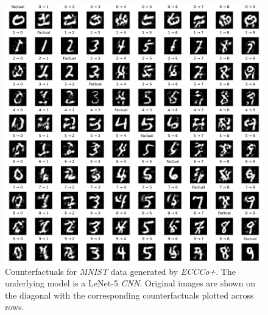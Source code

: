 \begin{figure}
  \centering
  \includegraphics[width=1.0\linewidth]{../www/mnist_all_lenet_eccco.png}
  \caption{Counterfactuals for \textit{MNIST} data generated by \textit{ECCCo+}. The underlying model is a LeNet-5 \textit{CNN}. Original images are shown on the diagonal with the corresponding counterfactuals plotted across rows.}\label{fig:mnist-eccco-lenet}
\end{figure}

